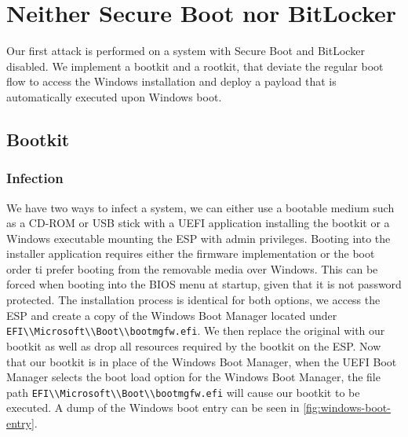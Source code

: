 
\section{Neither Secure Boot nor BitLocker}

Our first attack is performed on a system with Secure Boot and BitLocker disabled.
We implement a bootkit and a rootkit, that deviate the regular boot flow to access the Windows installation and deploy a payload that is automatically executed upon Windows boot.

\subsection{Bootkit}
\label{sec:attacks:neither:bootkit}


\subsubsection{Infection}


We have two ways to infect a system, we can either use a bootable medium such as a CD-ROM or \ac{USB} stick with a \ac{UEFI} application installing the bootkit or a Windows executable mounting the \ac{ESP} with admin privileges. Booting into the installer application requires either the firmware implementation or the boot order ti prefer booting from the removable media over Windows.
This can be forced when booting into the \ac{BIOS} menu at startup, given that it is not password protected.
The installation process is identical for both options, we access the \ac{ESP} and create a copy of the Windows Boot Manager located under \lstinline{EFI\\Microsoft\\Boot\\bootmgfw.efi}.
We then replace the original with our bootkit as well as drop all resources required by the bootkit on the \ac{ESP}.
Now that our bootkit is in place of the Windows Boot Manager, when the \ac{UEFI} Boot Manager selects the boot load option for the Windows Boot Manager, the file path \lstinline{EFI\\Microsoft\\Boot\\bootmgfw.efi} will cause our bootkit to be executed. A dump of the Windows boot entry can be seen in \autoref{fig:windows-boot-entry}.

